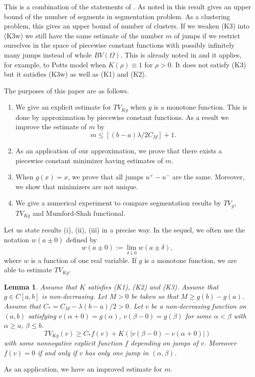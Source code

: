 \documentclass[12pt, reqno]{amsart}
\numberwithin{equation}{section}
\newtheorem{lemma}[thm]{Lemma}
\begin{document}
This is a combination of the statements of \cite[Theorem 1.1 and Theorem 1.2]{GKKOS}.
 As noted in \cite{GKKOS} this result gives an upper bound of the number of segments in segmentation problem.
 As a clustering problem, this gives an upper bound of number of clusters. %
 If we weaken (K3) into (K3w) we still have the same estimate of the number $m$ of jumps if we restrict ourselves in the space of piecewise constant functions with possibly infinitely many jumps instead of whole $BV(\Omega)$.
 This is already noted in \cite[Theorem 1.4]{GKKOS} and it applies, for example, to Potts model when $K(\rho)\equiv1$ for $\rho>0$.
 It does not satisfy (K3) but it satisfies (K3w) as well as (K1) and (K2).

The purposes of this paper are as follows.
\begin{enumerate} 
\item[(i)] 
We give an explicit estimate for $TV_{Kg}$ when $g$ is a monotone function.
 This is done by approximation by piecewise constant functions.
 As a result we improve the estimate of $m$ by
\[
	m \le \left[ (b-a) \lambda / 2C_M \right] + 1.
\]
\item[(i\hspace{-0.1em}i)] 
As an application of our approximation, we prove that there exists a piecewise constant minimizer having estimates of $m$.
\item[(i\hspace{-0.1em}i\hspace{-0.1em}i)]
When $g(x)=x$, we prove that all jumps $u^+-u^-$ are the same.
 Moreover, we show that minimizers are not unique.
\item[(i\hspace{-0.1em}v)]
We give a numerical experiment to compare segmentation results by $TV_g$, $TV_{Kg}$ and Mumford-Shah functional.
\end{enumerate} 

Let us state results (i), (i\hspace{-0.1em}i), (i\hspace{-0.1em}i\hspace{-0.1em}i) in a precise way.
 In the sequel, we often use the notation $w(a\pm0)$ defined by
\[
    w(a \pm 0) := \lim_{\delta\downarrow0} w(a\pm\delta),
\]
where $w$ is a function of one real variable.
 If $g$ is a monotone function, we are able to estimate $TV_{Kg}$.
\begin{lemma} \label{LWEBJ}
Assume that $K$ satisfies (K1), (K2) and (K3).
 Assume that $g\in C[a,b]$ is non-decreasing.
 Let $M>0$ be taken so that $M\ge g(b)-g(a)$.
 Assume that $C_*=C_M-\lambda(b-a)/2>0$.
 Let $v$ be a non-decreasing function on $(a,b)$ satisfying $v(\alpha+0)=g(\alpha)$, $v(\beta-0)=g(\beta)$ for some $\alpha<\beta$ with $\alpha\ge a$, $\beta\le b$.
\[
	TV_{Kg}(v) \ge C_* f(v)
	+ K \left( \left| v(\beta-0) - v(\alpha+0) \right| \right)
\]
with some nonnegative explicit function $f$ depending on jumps of $v$.
 Moreover $f(v)=0$ if and only if $v$ has only one jump in $(\alpha,\beta)$.
\end{lemma} 
As an application, we have an improved estimate for $m$.
\end{document}
